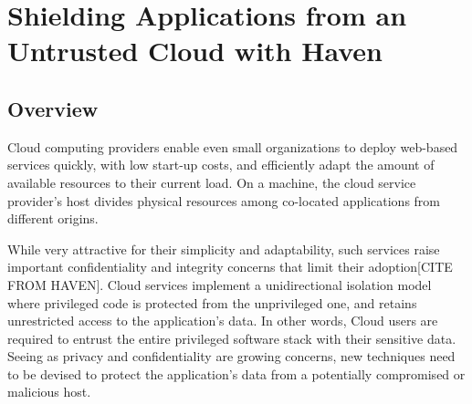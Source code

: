 \section{Shielding Applications from an Untrusted Cloud with Haven}

\subsection{Overview}

%
%

Cloud computing providers enable even small organizations to deploy web-based services quickly, with low start-up costs, and efficiently adapt the amount of available resources to their current load.
On a machine, the cloud service provider's host divides physical resources among co-located applications from different origins.

While very attractive for their simplicity and adaptability, such services raise important confidentiality and integrity concerns that limit their adoption[CITE FROM HAVEN].
Cloud services implement a unidirectional isolation model where privileged code is protected from the unprivileged one, and retains unrestricted access to the application's data.
In other words, Cloud users are required to entrust the entire privileged software stack with their sensitive data.
Seeing as privacy and confidentiality are growing concerns, new techniques need to be devised to protect the application's data from a potentially compromised or malicious host.\\

